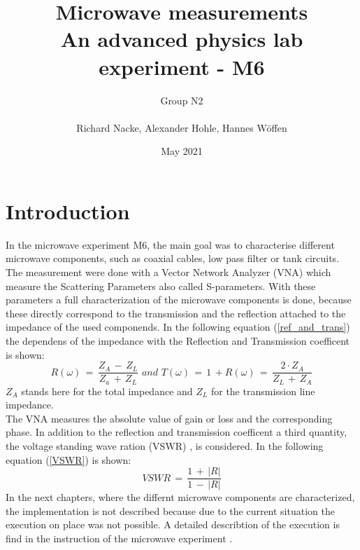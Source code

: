 \documentclass[a4paper,10pt]{scrreprt}
\title{Microwave measurements\\ An advanced physics lab experiment - M6}
\author{Group N2\\\\ Richard Nacke, Alexander Hohle, Hannes Wöffen}
\date{May 2021}
\begin{document}
    \maketitle
    
    \tableofcontents

    \newpage
    
    
    \newpage
    
    \chapter{Introduction}
        In the microwave experiment M6, the main goal was to characterise different microwave components, such as coaxial cables, low pass filter or tank circuits. The measurement were done with a Vector Network Analyzer (VNA) which measure the Scattering Parameters also called S-parameters. With these parameters a full characterization of the microwave components is done, because these directly correspond to the transmission and the reflection attached to the impedance of the used componends. In the following equation (\ref{ref_and_trans}) \cite{Instruction_experiment_M6} the dependens of the impedance with the Reflection and Transmission coefficent is shown:\\
        \begin{equation}
            R(\omega)\,=\,\frac{Z_A\,-\,Z_L}{Z_a\,+\,Z_L}\,\,and\,\,T(\omega)\,=\,1\,+R(\omega)\,=\,\frac{2\cdot Z_A}{Z_L\,+\,Z_A}
            \label{ref_and_trans}
        \end{equation}
        $Z_A$ stands here for the total impedance and $Z_L$ for the transmission line impedance.\\
        The VNA measures the absolute value of gain or loss and the corresponding phase. In addition to the reflection and transmission coefficent a third quantity, the voltage standing wave ration (VSWR) , is considered. In the following equation (\ref{VSWR}) \cite{Instruction_experiment_M6} is shown:\\
        \begin{equation}
            VSWR\,=\,\frac{1\,+\,|R|}{1\,-\,|R|}
            \label{VSWR}
        \end{equation}
        In the next chapters, where the differnt microwave components are characterized, the implementation is not described because due to the current situation the execution on place was not possible. A detailed describtion of the execution is find in the instruction of the microwave experiment \cite{Instruction_experiment_M6}.
    
\end{document}

